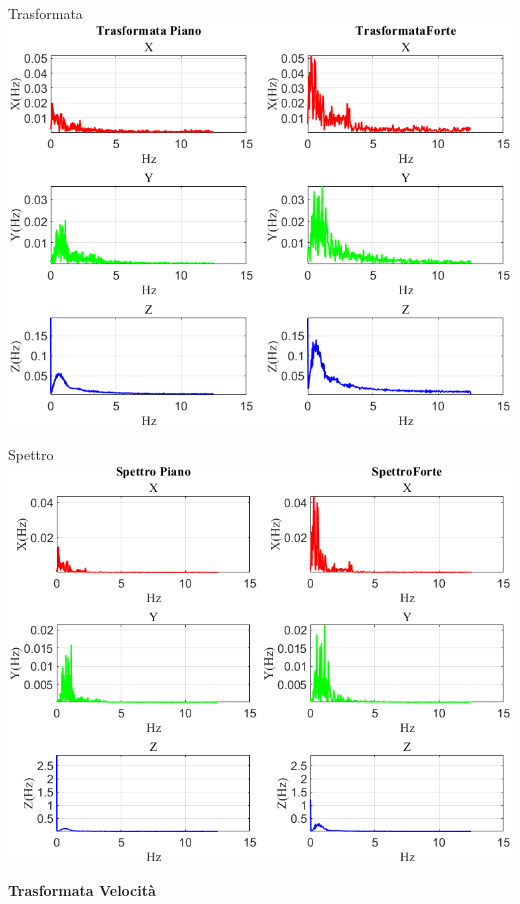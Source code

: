 	\begin{frame}{{Trasformata}}
		\centering\includegraphics[height=.8\textheight]{figure/Vel/Trasformata/Trasformata}
	\end{frame}
	
	\begin{frame}{{Spettro}}
		\centering\includegraphics[height=.8\textheight]{figure/Vel/Trasformata/Spettro}
	\end{frame}
	
	\begin{frame}
		\color{blue}\centering\huge{\textbf{Trasformata Velocità}}
	\end{frame}
	
